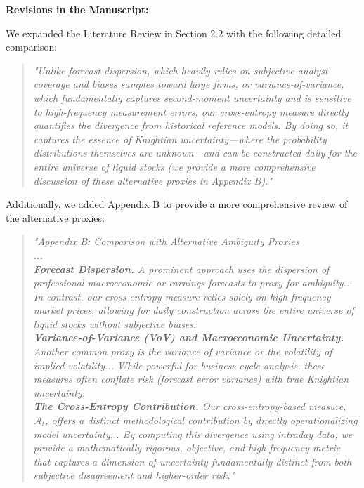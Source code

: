 \documentclass[12pt]{article}
\begin{document}
\begin{highlightbox}
\textbf{Revisions in the Manuscript:}

We expanded the Literature Review in Section 2.2 with the following detailed comparison:
\vspace{0.2cm}
\begin{quote}
\color{red}\itshape "Unlike forecast dispersion, which heavily relies on subjective analyst coverage and biases samples toward large firms, or variance-of-variance, which fundamentally captures second-moment uncertainty and is sensitive to high-frequency measurement errors, our cross-entropy measure directly quantifies the divergence from historical reference models. By doing so, it captures the essence of Knightian uncertainty---where the probability distributions themselves are unknown---and can be constructed daily for the entire universe of liquid stocks (we provide a more comprehensive discussion of these alternative proxies in Appendix B)."
\end{quote}

Additionally, we added Appendix B to provide a more comprehensive review of the alternative proxies:
\vspace{0.2cm}
\begin{quote}
\color{red}\itshape "Appendix B: Comparison with Alternative Ambiguity Proxies \\
... \\
\textbf{Forecast Dispersion.} A prominent approach uses the dispersion of professional macroeconomic or earnings forecasts to proxy for ambiguity... In contrast, our cross-entropy measure relies solely on high-frequency market prices, allowing for daily construction across the entire universe of liquid stocks without subjective biases.\\
\textbf{Variance-of-Variance (VoV) and Macroeconomic Uncertainty.} Another common proxy is the variance of variance or the volatility of implied volatility... While powerful for business cycle analysis, these measures often conflate risk (forecast error variance) with true Knightian uncertainty.\\
\textbf{The Cross-Entropy Contribution.} Our cross-entropy-based measure, $\mathcal{A}_t$, offers a distinct methodological contribution by directly operationalizing model uncertainty... By computing this divergence using intraday data, we provide a mathematically rigorous, objective, and high-frequency metric that captures a dimension of uncertainty fundamentally distinct from both subjective disagreement and higher-order risk."
\end{quote}
\end{highlightbox}
\end{document}
